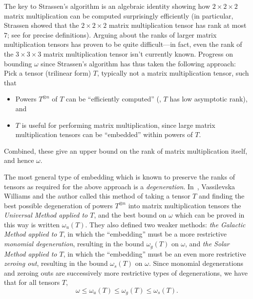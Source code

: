 \documentclass{toc}
\begin{document}
The key to Strassen's algorithm is an algebraic identity showing how $2 \times 2 \times 2$ matrix multiplication can be computed surprisingly efficiently (in particular, Strassen showed that the $2 \times 2 \times 2$ matrix multiplication tensor has rank at most $7$; see  for precise definitions). Arguing about the ranks of larger matrix multiplication tensors has proven to be quite difficult---in fact, even the rank of the $3 \times 3 \times 3$ matrix multiplication tensor isn't currently known. Progress on bounding $\omega$ since Strassen's algorithm has thus taken the following approach: Pick a tensor (trilinear form) $T$, typically not a matrix multiplication tensor, such that
\begin{itemize}
    \item Powers $T^{\otimes n}$ of $T$ can be ``efficiently computed'' (\ie, $T$ has low asymptotic rank), and
    \item $T$ is useful for performing matrix multiplication, since large matrix multiplication tensors can be ``embedded'' within powers of $T$.
\end{itemize}
Combined, these give an upper bound on the rank of matrix multiplication itself, and hence $\omega$.

The most general type of embedding which is known to preserve the ranks of tensors as required for the above approach is a \emph{degeneration}. In~\cite{aw}, %
Vassilevska Williams and the author %
 called this method of taking a tensor $T$ and finding the best possible degeneration of powers $T^{\otimes n}$ into matrix multiplication tensors the \emph{Universal Method applied to $T$}, and the best bound on $\omega$ which can be proved in this way is written $\omega_u(T)$. They also defined two weaker methods: \emph{the Galactic Method applied to $T$}, in which the ``embedding'' must be a more restrictive \emph{monomial degeneration}, resulting in the bound $\omega_g(T)$ on $\omega$, and \emph{the Solar Method applied to $T$}, in which the ``embedding'' must be an even more restrictive \emph{zeroing out}, resulting in the bound $\omega_s(T)$ on $\omega$. Since monomial degenerations and zeroing outs are successively more restrictive types of degenerations, we have that for all tensors $T$, $$\omega \leq \omega_u(T) \leq \omega_g(T) \leq \omega_s(T).$$
\end{document}
